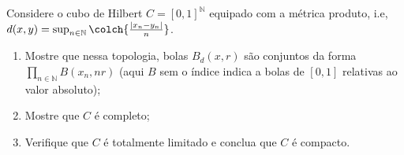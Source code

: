 \begin{Mybox}
Considere o cubo de Hilbert $C = [0, 1]^{\mathbb{N}}$ equipado com a métrica produto, i.e, $d(x, y) = \sup_{n \in \mathbb{N}} \colch{\frac{|x_n - y_n|}{n}}$.
\begin{enumerate}[label=\color{blue}\normalfont\textbf{(\alph*)}]
\item Mostre que nessa topologia, bolas $B_d(x, r)$ são conjuntos da forma $\prod_{n \in \mathbb{N}} B(x_n, nr)$ (aqui $B$ sem o índice indica a bolas de $[0, 1]$ relativas ao valor absoluto);
\item Mostre que $C$ é completo;
\item Verifique que $C$ é totalmente limitado e conclua que $C$ é compacto. 
\end{enumerate}
\vspace{-.4cm}
\end{Mybox}
\vspace{-.5cm}
